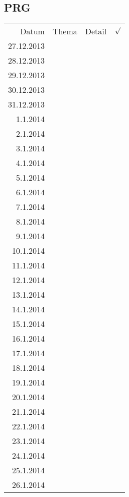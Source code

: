 \subsection{PRG}
\begin{tabular}{r l p{} l}
\rowcolor{lgray} Datum       & Thema         & Detail & $\surd$ \\
\rowcolor{white}  27.12.2013 &               &  &  \\
\rowcolor{lgray}  28.12.2013 &               &  &  \\
\rowcolor{white}  29.12.2013 &               &  &  \\
\rowcolor{lgray}  30.12.2013 &               &  &  \\
\rowcolor{white}  31.12.2013 &               &  &  \\
\rowcolor{lgray}    1.1.2014 &               &  &  \\
\rowcolor{white}    2.1.2014 &               &  &  \\
\rowcolor{lgray}    3.1.2014 &               &  &  \\
\rowcolor{white}    4.1.2014 &               &  &  \\
\rowcolor{lgray}    5.1.2014 &               &  &  \\
\rowcolor{white}    6.1.2014 &               &  &  \\
\rowcolor{lgray}    7.1.2014 &               &  &  \\
\rowcolor{white}    8.1.2014 &               &  &  \\
\rowcolor{lgray}    9.1.2014 &               &  &  \\
\rowcolor{white}   10.1.2014 &               &  &  \\
\rowcolor{lgray}   11.1.2014 &               &  &  \\
\rowcolor{white}   12.1.2014 &               &  &  \\
\rowcolor{lgray}   13.1.2014 &               &  &  \\
\rowcolor{white}   14.1.2014 &               &  &  \\
\rowcolor{lgray}   15.1.2014 &               &  &  \\
\rowcolor{white}   16.1.2014 &               &  &  \\
\rowcolor{lgray}   17.1.2014 &               &  &  \\
\rowcolor{white}   18.1.2014 &               &  &  \\
\rowcolor{lgray}   19.1.2014 &               &  &  \\
\rowcolor{white}   20.1.2014 &               &  &  \\
\rowcolor{lgray}   21.1.2014 &               &  &  \\
\rowcolor{white}   22.1.2014 &               &  &  \\
\rowcolor{lgray}   23.1.2014 &               &  &  \\
\rowcolor{white}   24.1.2014 &               &  &  \\
\rowcolor{lgray}   25.1.2014 &               &  &  \\
\rowcolor{white}   26.1.2014 &               &  &  \\
\end{tabular}

